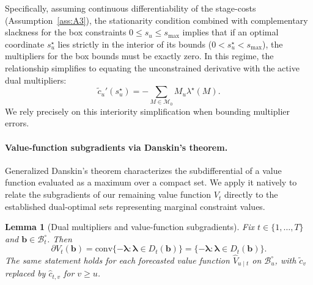 \documentclass[11pt]{article}
\newtheorem{lemma}{Lemma}[section]
\newcommand{\1}{\mathbf{1}}
\newcommand{\mcal}{\mathcal{M}}
\newcommand{\bcal}{\mathcal{B}}
\newcommand{\subdiff}{\partial}
\begin{document}
Specifically, assuming continuous differentiability of the stage-costs (Assumption~\ref{ass:A3}), the stationarity condition combined with complementary slackness for the box constraints $0 \leq s_u \leq s_{\max}$ implies that if an optimal coordinate $s_u^\star$ lies strictly in the interior of its bounds ($0 < s_u^\star < s_{\max}$), the multipliers for the box bounds must be exactly zero.
In this regime, the relationship simplifies to equating the unconstrained derivative with the active dual multipliers:
\begin{equation*}
  \tilde{c}_u'(s_u^\star) = - \sum_{M \in \mcal_0} M_u \lambda^\star(M).
\end{equation*}
We rely precisely on this interiority simplification when bounding multiplier errors.


\paragraph{Value-function subgradients via Danskin's theorem.}
Generalized Danskin's theorem characterizes the subdifferential of a value function evaluated as a maximum over a compact set. We apply it natively to relate the subgradients of our remaining value function $V_t$ directly to the established dual-optimal sets representing marginal constraint values.

\begin{lemma}[Dual multipliers and value-function subgradients]
  \label{lem:dual-subgrad}%
  Fix $t \in \{1,\dots,T\}$ and $\mathbf{b} \in \bcal_t^\circ$.
  Then
  \begin{equation*}
    \subdiff V_t(\mathbf{b})
    = \mathrm{conv}\{-\boldsymbol{\lambda} : \boldsymbol{\lambda} \in D_t(\mathbf{b})\}
    = \{-\boldsymbol{\lambda} : \boldsymbol{\lambda} \in D_t(\mathbf{b})\}.
  \end{equation*}
  The same statement holds for each forecasted value function $\hat{V}_{u \mid t}$ on $\bcal_u^\circ$, with $\tilde{c}_v$ replaced by $\hat{c}_{t,v}$ for $v \geq u$.
\end{lemma}
\end{document}
